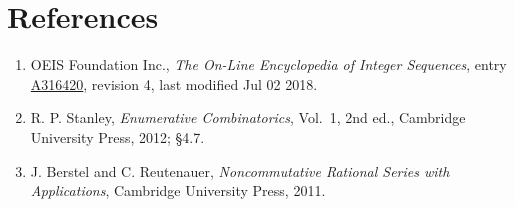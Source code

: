\documentclass[11pt]{article}
\theoremstyle{definition}
\begin{document}
\section{References}

\begin{enumerate}

\item OEIS Foundation Inc., \emph{The On-Line Encyclopedia of Integer Sequences}, entry \href{https://oeis.org/A316420}{A316420}, revision 4, last modified Jul 02 2018.

\item R. P. Stanley, \emph{Enumerative Combinatorics}, Vol.~1, 2nd ed., Cambridge University Press, 2012; \S4.7.

\item J. Berstel and C. Reutenauer, \emph{Noncommutative Rational Series with Applications}, Cambridge University Press, 2011.

\end{enumerate}
\end{document}
